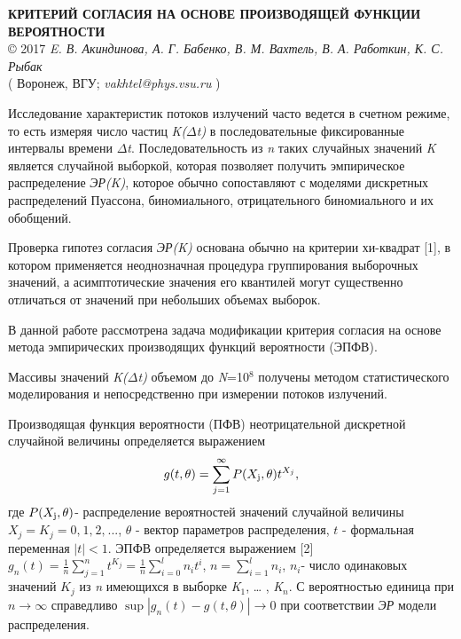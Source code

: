 \begin{center}{ \bf  КРИТЕРИЙ СОГЛАСИЯ НА ОСНОВЕ ПРОИЗВОДЯЩЕЙ ФУНКЦИИ ВЕРОЯТНОСТИ}\\
{\copyright} 2017 {\it  E. В. Акиндинова, А. Г. Бабенко, В. М. Вахтель,
В. А. Работкин, К. С. Рыбак} \\
( Воронеж, ВГУ; {\it vakhtel@phys.vsu.ru} )
\end{center}

Исследование характеристик потоков излучений часто ведется в счетном режиме,
то есть измеряя число частиц \textit{K($\Delta$t)}  в последовательные фиксированные интервалы времени \textit{$\Delta$t}. Последовательность из \textit{n} таких случайных значений \textit{K} является случайной выборкой, которая позволяет получить эмпирическое распределение \textit{ЭР(K)}, которое обычно сопоставляют с моделями дискретных распределений Пуассона, биномиального, отрицательного биномиального и их обобщений.

Проверка гипотез согласия \textit{ЭР(K)} основана обычно на критерии хи-квадрат [1], в котором применяется неоднозначная процедура группирования выборочных значений, а асимптотические значения его квантилей могут существенно отличаться от значений при небольших объемах выборок.

В данной работе рассмотрена задача модификации критерия согласия на основе метода эмпирических производящих функций вероятности (ЭПФВ).

Массивы значений \textit{K($\Delta$t)} объемом до \textit{N}=10${}^{8}$ получены методом статистического моделирования и непосредственно при измерении потоков излучений.

Производящая функция вероятности (ПФВ) неотрицательной дискретной случайной величины определяется выражением
\[g(t,\theta )=\sum _{j=1}^{\infty }P(X_{{\rm j}} ,\theta )t^{X_{j} }  ,\]
где $P(X_{{\rm j}} ,\theta )$- распределение вероятностей значений случайной величины $X_{j} =K_{j} =0,_{} 1,_{} 2,_{} ...$, $\theta $ - вектор параметров распределения, $t$ - формальная переменная $\left|t\right|<1$. ЭПФВ определяется выражением [2]
$g_{n} (t)=\frac{1}{n} \sum _{j=1}^{n}t^{K_{j} }  =\frac{1}{n} \sum _{i=0}^{l}n_{i} t^{i}  $, $n=\sum _{i=1}^{l}n_{i}  $,  $n_{i} $- число одинаковых значений $K_{j} $ из \textit{n} имеющихся в выборке \textit{K}${}_{1}$,  {\dots} , \textit{K${}_{n}$}. С вероятностью единица при $n\to \infty $ справедливо $\sup \left|g_{n} (t)-g(t,\theta )\right|\to 0$ при соответствии \textit{ЭР} модели распределения.

